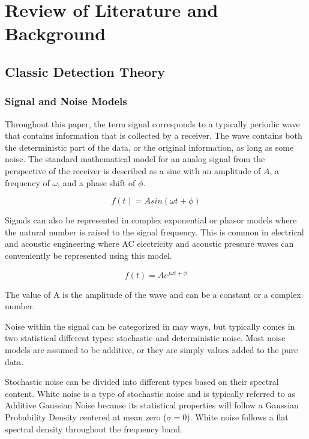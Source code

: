 \chapter{Review of Literature and Background} \label{ch:lit_review}

    \section{Classic Detection Theory} \label{se:classic_theory}

        \subsection{Signal and Noise Models} \label{ss:signal_noise_models}
            Throughout this paper, the term signal corresponds to a typically periodic wave that contains information that is collected by a receiver. The wave contains both the deterministic part of the data, or the original information, as long as some noise. The standard mathematical model for an analog signal from the perspective of the receiver is described as a sine with an amplitude of $A$, a frequency of $\omega$, and a phase shift of $\phi$.  

            \begin{equation}
                f(t) = Asin(\omega t + \phi)
            \end{equation}
            
            Signals can also be represented in complex exponential or phasor models where the natural number is raised to the signal frequency. This is common in electrical and acoustic engineering where AC electricity and acoustic pressure waves can conveniently be represented using this model.
            
            \begin{equation}
                f(t) = Ae^{j\omega t + \phi}
            \end{equation}

            The value of A is the amplitude of the wave and can be a constant or a complex number. 
            
            Noise within the signal can be categorized in may ways, but typically comes in two statistical different types: stochastic and deterministic noise. Most noise models are assumed to be additive, or they are simply values added to the pure data.
            
            Stochastic noise can be divided into different types based on their spectral content. White noise is a type of stochastic noise and is typically referred to as Additive Gaussian Noise because its statistical properties will follow a Gaussian Probability Density centered at mean zero ($\sigma = 0$). White noise follows a flat spectral density throughout the frequency band.
            

